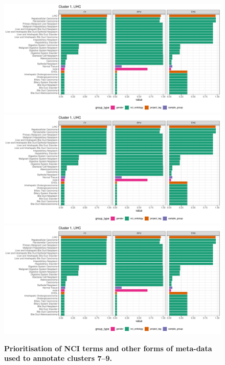 \begin{figure}[H]
\centering
\includegraphics[width=.95\linewidth,page=7]{fig/tcga/cluster_labelling.pdf}
\includegraphics[width=.95\linewidth,page=8]{fig/tcga/cluster_labelling.pdf}
\includegraphics[width=.95\linewidth,page=9]{fig/tcga/cluster_labelling.pdf}
\caption{
	\textbf{Prioritisation of NCI terms and other forms of meta-data used to annotate clusters 7--9.} 
}
\label{fig:cluslab3}
\end{figure}

